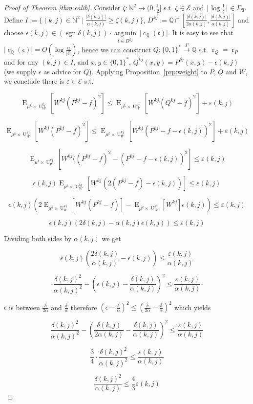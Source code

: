 \documentclass{article}
\numberwithin{equation}{section}
\theoremstyle{definition}
\theoremstyle{plain}
\newcommand{\Bool}{\{0,1\}}
\newcommand{\Words}{{\Bool^*}}
\DeclareMathOperator{\Sgn}{sgn}
\DeclareMathOperator{\E}{E}
\DeclareMathOperator{\R}{r}
\DeclareMathOperator{\U}{U}
\DeclareMathOperator{\En}{c}
\newcommand{\Argmin}[1]{\underset{#1}{\operatorname{arg\,min}}\,}
\newcommand{\Nats}{\mathbb{N}}
\newcommand{\Rats}{\mathbb{Q}}
\newcommand{\Abs}[1]{\lvert #1 \rvert}
\newcommand{\Floor}[1]{\lfloor #1 \rfloor}
\newcommand{\GrowA}{\Gamma_{\mathfrak{A}}}
\newcommand{\Fall}{\mathcal{E}}
\newcommand{\Scheme}{\xrightarrow{\Gamma}}
\begin{document}
\begin{proof}[Proof of Theorem \ref{thm:calib}]

Consider $\zeta: \Nats^2 \rightarrow (0,\frac{1}{2}]$ s.t.  $\zeta \in \Fall$ and $\Floor{\log \frac{1}{\zeta}} \in \GrowA$. Define $I:=\{(k,j) \in \Nats^2 \mid \frac{\Abs{\delta(k,j)}}{\alpha(k,j)} \geq \zeta(k,j)\}$, $D^{kj}:=\Rats \cap [\frac{\Abs{\delta(k,j)}}{2\alpha(k,j)},\frac{\Abs{\delta(k,j)}}{\alpha(k,j)}]$ and choose ${\epsilon(k,j) \in (\Sgn \delta(k,j)) \cdot \Argmin{t \in D^{kj}} \Abs{\En_\Rats(t)}}$. It is easy to see that ${\Abs{\En_\Rats(\epsilon)} = O(\log \frac{\alpha}{\Abs{\delta}})}$, hence we can construct $Q: \Words \Scheme \Rats$ s.t. $\R_Q=\R_P$ and for any $(k,j) \in I$, and $x,y \in \Words$, $Q^{kj}(x,y)=P^{kj}(x,y)-\epsilon(k,j)$ (we supply $\epsilon$ as advice for $Q$). Applying Proposition~\ref{prp:weight} to $P$, $Q$ and $W$, we conclude there is $\varepsilon \in \Fall$ s.t.

$$\E_{\mu^k \times \U_W^{kj}}[W^{kj}(P^{kj} - f)^2] \leq \E_{\mu^k \times \U_W^{kj}}[W^{kj}(Q^{kj}-f)^2] + \varepsilon(k,j)$$

$$\E_{\mu^k \times \U_W^{kj}}[W^{kj}(P^{kj} - f)^2] \leq \E_{\mu^k \times \U_W^{kj}}[W^{kj}(P^{kj}-f-\epsilon(k,j))^2] + \varepsilon(k,j)$$

$$\E_{\mu^k \times \U_W^{kj}}[W^{kj}((P^{kj} - f)^2 - (P^{kj}-f-\epsilon(k,j))^2] \leq \varepsilon(k,j)$$

$$ \epsilon(k,j) \E_{\mu^k \times \U_W^{kj}}[W^{kj}(2(P^{kj} - f) - \epsilon(k,j))] \leq \varepsilon(k,j)$$

$$ \epsilon(k,j) (2 \E_{\mu^k \times \U_W^{kj}}[W^{kj}(P^{kj} - f)]-\E_{\mu^k \times \U_W^{kj}}[W^{kj}]\epsilon(k,j)) \leq \varepsilon(k,j)$$

$$ \epsilon(k,j) (2 \delta(k,j) - \alpha(k,j)\epsilon(k,j)) \leq \varepsilon(k,j)$$

Dividing both sides by $ \alpha(k,j)$ we get

$$\epsilon(k,j) (\frac{2\delta(k,j)}{\alpha(k,j)} - \epsilon(k,j)) \leq \frac{\varepsilon(k,j)}{\alpha(k,j)}$$

$$\frac{\delta(k,j)^2}{\alpha(k,j)^2}-(\epsilon(k,j) - \frac{\delta(k,j)}{\alpha(k,j)})^2 \leq \frac{\varepsilon(k,j)}{\alpha(k,j)}$$

$\epsilon$ is between $\frac{\delta}{2\alpha}$ and $\frac{\delta}{\alpha}$ therefore $(\epsilon-\frac{\delta}{\alpha})^2 \leq (\frac{\delta}{2\alpha} - \frac{\delta}{\alpha})^2$  which yields

$$\frac{\delta(k,j)^2}{\alpha(k,j)^2}-(\frac{\delta(k,j)}{2\alpha(k,j)} - \frac{\delta(k,j)}{\alpha(k,j)})^2 \leq \frac{\varepsilon(k,j)}{\alpha(k,j)}$$

$$\frac{3}{4} \cdot \frac{\delta(k,j)^2}{\alpha(k,j)^2} \leq \frac{\varepsilon(k,j)}{\alpha(k,j)}$$

$$\frac{\delta(k,j)^2}{\alpha(k,j)} \leq \frac{4}{3}\varepsilon(k,j)$$

\end{proof}
\end{document}
